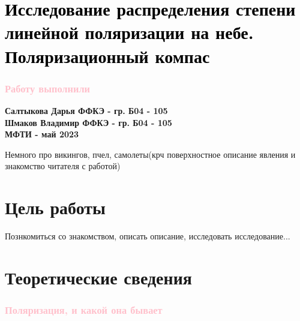 \documentclass[14pt, singlecolumn, citestyle=authoryear]{elegantbook}
\begin{document}
\mainmatter


\makeatletter
\patchcmd{\chapter}{\if@openright\cleardoublepage\else\clearpage\fi}{}{}{}
\makeatother



\chapter*{\textbf{\huge \textcolor{black}{Исследование распределения степени линейной поляризации на небе. Поляризационный компас}}}

\subsection*{\textcolor{pink}{Работу выполнили}}

\raggedright \textbf{Салтыкова Дарья ФФКЭ - гр. Б04 - 105} \\
\textbf{Шмаков Владимир ФФКЭ - гр. Б04 - 105} \\
\textbf{МФТИ - май 2023}


\begin{tcolorbox}[enhanced,attach boxed title to top center={yshift=-3mm,yshifttext=-1mm},colback=blue!5!white,colframe=blue!75!black,colbacktitle=blue!80!black,title=ВВЕДЕНИЕ,fonttitle=\bfseries, boxed title style={size=small,colframe=blue!75!black} ]
  Немного про викингов, пчел, самолеты(крч поверхностное описание явления и знакомство читателя с работой)

\end{tcolorbox}

\hspace*{1em}

\chapter*{Цель работы} 
Познкомиться со знакомством, описать описание, исследовать исследование...

\hspace*{1em}

\chapter*{Теоретические сведения}
\subsection*{\textcolor{pink}{Поляризация, и какой она бывает}}
\end{document}
